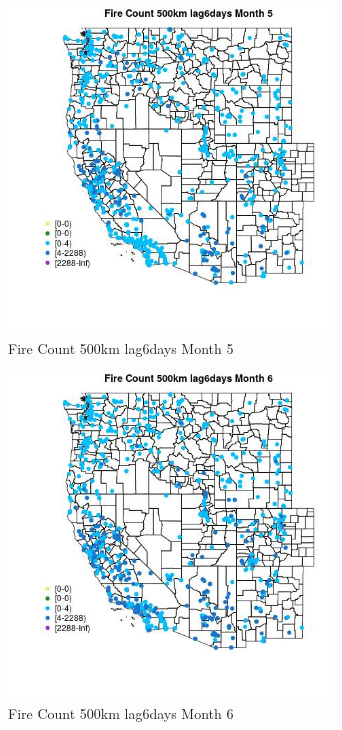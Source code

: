 \begin{figure} 
\centering  
\includegraphics[width=0.77\textwidth]{Code_Outputs/Report_ML_input_PM25_Step4_part_e_de_duplicated_aves_compiled_2019-05-21wNAs_MapObsMo5Fire_Count_500km_lag6days.jpg} 
\caption{\label{fig:Report_ML_input_PM25_Step4_part_e_de_duplicated_aves_compiled_2019-05-21wNAsMapObsMo5Fire_Count_500km_lag6days}Fire Count 500km lag6days Month 5} 
\end{figure} 
 

\begin{figure} 
\centering  
\includegraphics[width=0.77\textwidth]{Code_Outputs/Report_ML_input_PM25_Step4_part_e_de_duplicated_aves_compiled_2019-05-21wNAs_MapObsMo6Fire_Count_500km_lag6days.jpg} 
\caption{\label{fig:Report_ML_input_PM25_Step4_part_e_de_duplicated_aves_compiled_2019-05-21wNAsMapObsMo6Fire_Count_500km_lag6days}Fire Count 500km lag6days Month 6} 
\end{figure} 
 

